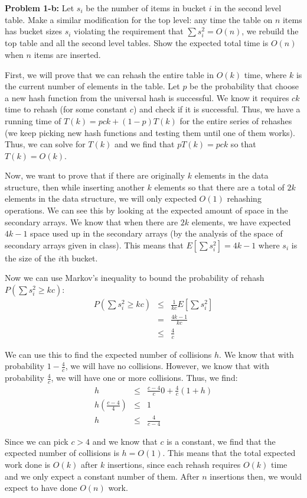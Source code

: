 \documentclass[psamsfonts]{amsart}
\newenvironment{sol}{\vspace{0.25cm}{\large \bfseries Solution:}}{\qedsymbol}
\newenvironment{prob}[1]{\begin{framed}{\large \bfseries Problem #1:}}{\end{framed}}
\begin{document}
\begin{prob}{1-b}
Let $s_i$ be the number of items in bucket $i$ in the second level table. Make a similar modification for the top level: any time the table on $n$ items has bucket sizes $s_i$ violating the requirement that $\sum s_i^2 = O(n)$, we rebuild the top table and all the second level tables. Show the expected total time is $O(n)$ when $n$ items are inserted.
\end{prob}
\begin{sol}
First, we will prove that we can rehash the entire table in $O(k)$ time, where $k$ is the current number of elements in the table. Let $p$ be the probability that choose a new hash function from the universal hash is successful. We know it requires $ck$ time to rehash (for some constant $c$) and check if it is successful. Thus, we have a running time of $T(k) = p ck + (1-p) T(k)$ for the entire series of rehashes (we keep picking new hash functions and testing them until one of them works). Thus, we can solve for $T(k)$ and we find that $p T(k) = p ck $ so that $T(k) = O(k)$.

Now, we want to prove that if there are originally $k$ elements in the data structure, then while inserting another $k$ elements so that there are a total of $2k$ elements in the data structure, we will only expected $O(1)$ rehashing operations. We can see this by looking at the expected amount of space in the secondary arrays. We know that when there are $2k$ elements, we have expected $4k - 1$ space used up in the secondary arrays (by the analysis of the space of secondary arrays given in class). This means that $E[\sum s_i^2] = 4k - 1$ where $s_i$ is the size of the $i$th bucket. 

Now we can use Markov's inequality to bound the probability of rehash $P(\sum s_i^2 \geq kc )$:
\begin{eqnarray}
P(\sum s_i^2 \geq kc ) &\leq& \frac{1}{kc} E[\sum s_i^2] \\
&=& \frac{4k - 1}{kc} \\
&\leq& \frac{4}{c}
\end{eqnarray}

We can use this to find the expected number of collisions $h$. We know that with probability $1 - \frac{4}{c}$, we will have no collisions. However, we know that with probability $\frac{4}{c}$, we will have one or more collisions. Thus, we find:
\begin{eqnarray}
h &\leq& \frac{c - 4}{c} 0 + \frac{4}{c} ( 1 + h) \\
h \left( \frac{c - 4}{4} \right) &\leq& 1 \\
h &\leq& \frac{4}{c-4}
\end{eqnarray}

Since we can pick $c > 4$ and we know that $c$ is a constant, we find that the expected number of collisions is $h = O(1)$. This means that the total expected work done is $O(k)$ after $k$ insertions, since each rehash requires $O(k)$ time and we only expect a constant number of them. After $n$ insertions then, we would expect to have done $O(n)$ work.
\end{sol}
\end{document}
